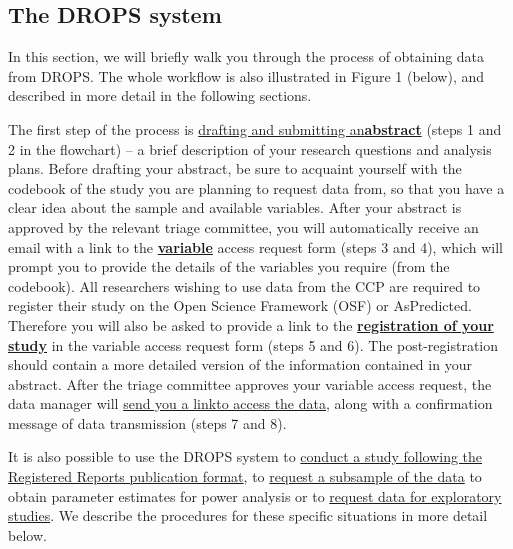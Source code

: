 \documentclass[
]{article}
\begin{document}
\hypertarget{section-1}{%
\subsection{}\label{section-1}}

\hypertarget{the-drops-system}{%
\subsection{The DROPS system}\label{the-drops-system}}

In this section, we will briefly walk you through the process of
obtaining data from DROPS. The whole workflow is also illustrated in
Figure 1 (below), and described in more detail in the following
sections.

The first step of the process is
\protect\hyperlink{_c0rqoo2n1ad5}{drafting and submitting
an}\protect\hyperlink{_c0rqoo2n1ad5}{\textbf{abstract}} (steps 1 and 2
in the flowchart) --⁠ a brief description of your research questions and
analysis plans. Before drafting your abstract, be sure to acquaint
yourself with the codebook of the study you are planning to request data
from, so that you have a clear idea about the sample and available
variables. After your abstract is approved by the relevant triage
committee, you will automatically receive an email with a link to the
\protect\hyperlink{_2dzt9xeysbee}{\textbf{variable}} access request form
(steps 3 and 4), which will prompt you to provide the details of the
variables you require (from the codebook). All researchers wishing to
use data from the CCP are required to register their study on the Open
Science Framework (OSF) or AsPredicted. Therefore you will also be asked
to provide a link to the
\protect\hyperlink{_d60pemtq0onl}{\textbf{registration of your study}}
in the variable access request form (steps 5 and 6). The
post-registration should contain a more detailed version of the
information contained in your abstract. After the triage committee
approves your variable access request, the data manager will
\protect\hyperlink{_kciim8tnzl6e}{send you a
link}\protect\hyperlink{_kciim8tnzl6e}{to access the data}, along with a
confirmation message of data transmission (steps 7 and 8).

It is also possible to use the DROPS system to
\protect\hyperlink{_uquq4hhmcg15}{conduct a study following the
Registered Reports publication format}, to
\protect\hyperlink{_qlx2etgrq9hr}{request a subsample of the data} to
obtain parameter estimates for power analysis or to
\protect\hyperlink{_q6nxcc4a4n2f}{request data for exploratory studies}.
We describe the procedures for these specific situations in more detail
below.
\end{document}
